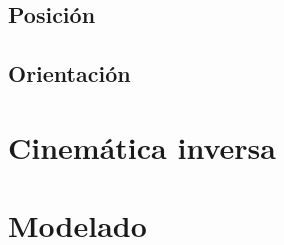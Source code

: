 \subsection{Posición}



\subsection{Orientación}

\section{Cinemática inversa}

\section{Modelado}

\begin{lstlisting}[frame=single]
    % Declaracion de las variables simbolicas
\end{lstlisting}